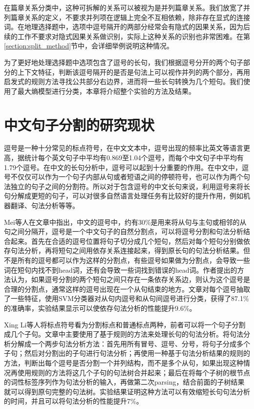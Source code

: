 \documentclass[master, winfont]{njuthesis}
\begin{document}
在篇章关系分类中，这种可拆解的关系可以被视为是并列篇章关系。我们放宽了并列篇章关系的定义，不要求并列项在逻辑上完全不互相依赖，除非存在显式的连接词。在地理选择题中，选项中逗号隔开的两部分经常会有隐式的因果关系，因为后续的工作不要求对隐式因果关系做识别，实际上这种关系的识别也非常困难。在第\ref{section:split_method}节中，会详细举例说明这种情况。

为了更好地处理选择题中选项包含了逗号的长句，我们根据逗号分开的两个句子部分的上下文特征，判断该逗号隔开的是否是句法上可以视作并列的两个部分，再用启发式的规则方法寻找公共部分右边界，进而将一些长句转换为几个短句。我们使用了最大熵模型进行分类，本章将介绍整个实验的方法及结果。

\section{中文句子分割的研究现状}
逗号是一种十分常见的标点符号，在中文文本中，逗号出现的频率比英文等语言更高，据统计每个英文句子中平均有0.869至1.04个逗号，而每个中文句子中平均有1.79个逗号\cite{Jin2004}。在中文的长句分析中，逗号可以起到十分重要的作用。在中文中，逗号不仅仅可以作为一个句子内部从句或者短语之间的停顿符号\cite{Li2004}，也可以作为两个句法独立的句子之间的分割符\cite{Xu2013}\cite{Xue2011}。所以对于包含逗号的中文长句来说，利用逗号来将长句分解成更短的句子，可以对很多自然语言处理任务有比较好的提升作用，例如机器翻译\cite{Wang2014}、句法分析\cite{Jin2004}\cite{Li2004}\cite{MQ}\cite{Kong2014}\cite{Li2004}\cite{Li2008}等等。

Mei等人\cite{Jin2004}在文章中指出，中文的逗号中，约有30\%是用来将从句与主句或相邻的从句之间分隔开，逗号是一个中文句子的自然分割点，可以将逗号分割和句法分析结合起来。首先在合适的逗号位置将句子切分成几个短句，然后对每个短句分别做依存句法分析，再将短句之间用依存关系连接起来，得到原长句的句法分析结果。但不是所有的逗号都可以作为这样的分割点，有些逗号如果做为分割点，会导致一些词在短句内找不到head词，还有会导致一些词找到错误的head词。作者提出的方法认为，如果逗号分割的两个短句之间只存在一条依存关系边，则认为这个逗号是合理的分割点，通常这样的逗号出现在一个从句结束的地方。文章对每个逗号抽取了一些特征，使用SVM分类器对从句内逗号和从句间逗号进行分类，获得了87.1\%的准确率，实验结果显示可以使依存句法分析的性能提升9.6\%。

Xing Li等人\cite{Li2004}将标点符号看为分割标点和普通标点两种，前者可以将一个句子分割成几个子句。文章中主要使用了基于规则的方法来处理长句的句法分析。将句法分析分解成一个两步句法分析方法：首先用所有冒号、逗号、分号，将句子分成多个子句；然后对分割出的子句进行句法分析；再使用一种基于句法分析结果的规则的方法，判断出每个逗号是否分割一个并列结构，而不是多个从句，如果出现这种情况再使用规则的方法将这几个子句的句法树合并起来；最后在将每个子树的根节点的词性标签序列作为句法分析的输入，再做第二次parsing，结合前面的子树结果就可以得到原句完整的句法树。实验结果证明这种方法可以有效缩短长句句法分析的时间，并且可以将句法分析的性能提升7\%。
\end{document}

